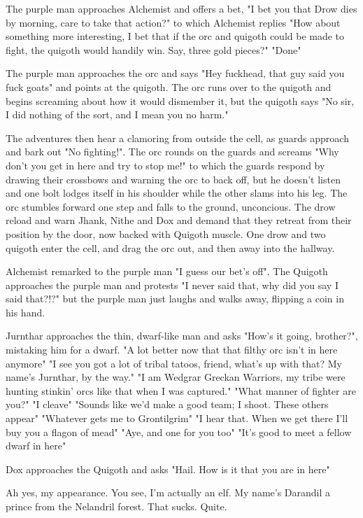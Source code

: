 \documentclass[letterpaper,10pt,twoside,twocolumn,openany]{book}
\begin{document}
The purple man approaches Alchemist and offers a bet, "I bet you that Drow dies by morning, care to take that action?" to which Alchemist replies "How about something more interesting, I bet that if the orc and quigoth could be made to fight, the quigoth would handily win. Say, three gold pieces?" "Done"

The purple man approaches the orc and says "Hey fuckhead, that guy said you fuck goats" and points at the quigoth. The orc runs over to the quigoth and begins screaming about how it would dismember it, but the quigoth says "No sir, I did nothing of the sort, and I mean you no harm."

The adventures then hear a clamoring from outside the cell, as guards approach and bark out "No fighting!". The orc rounds on the guards and screams "Why don't you get in here and try to stop me!" to which the guards respond by drawing their crossbows and warning the orc to back off, but he doesn't listen and one bolt lodges itself in his shoulder while the other slams into his leg. The orc stumbles forward one step and falls to the ground, unconcious. The drow reload and warn Jhank, Nithe and Dox and demand that they retreat from their position by the door, now backed with Quigoth muscle. One drow and two quigoth enter the cell, and drag the orc out, and then away into the hallway.

Alchemist remarked to the purple man "I guess our bet's off". The Quigoth approaches the purple man and protests "I never said that, why did you say I said that?!?" but the purple man just laughs and walks away, flipping a coin in his hand.

Jurnthar approaches the thin, dwarf-like man and asks "How's it going, brother?", mistaking him for a dwarf. "A lot better now that that filthy orc isn't in here anymore"
"I see you got a lot of tribal tatoos, friend, what's up with that? My name's Jurnthar, by the way."
"I am Wedgrar Greckan Warriors, my tribe were hunting stinkin' orcs like that when I was captured."
"What manner of fighter are you?"
"I cleave"
"Sounds like we'd make a good team; I shoot. These others appear"
"Whatever gets me to Grontilgrim"
"I hear that. When we get there I'll buy you a flagon of mead"
"Aye, and one for you too"
"It's good to meet a fellow dwarf in here"

Dox approaches the Quigoth and asks "Hail. How is it that you are in here"

Ah yes, my appearance. You see, I'm actually an elf. My name's Darandil a prince from the Nelandril forest.
That sucks.
Quite.
\end{document}
